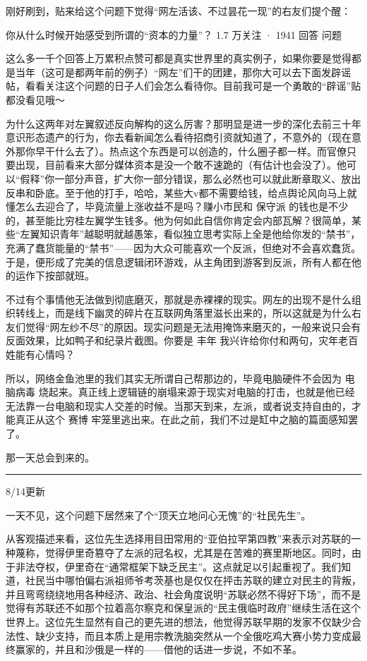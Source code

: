 \begin{zhihuanswer}
刚好刷到，贴来给这个问题下觉得``网左活该、不过昙花一现''的右友们提个醒：

你从什么时候开始感受到所谓的``资本的力量''？ 1.7 万关注 · 1941 回答 问题

这么多一千个回答上万累积点赞可都是真实世界里的真实例子，如果你要是觉得都是当年（这可是都两年前的例子）``网左''们干的团建，那你大可以去下面发辟谣帖，看看关注这个问题的日子人们会怎么看待你。目前我可是一个勇敢的``辟谣''贴都没看见哦～

为什么这两年对左翼叙述反向解构的这么厉害？那明显是进一步的深化去前三十年意识形态遗产的行为，你去看新闻怎么看待招商引资就知道了，不意外的（现在意外那你早干什么去了）。热点这个东西是可以创造的，什么圈子都一样。而官僚只要出现，目前看来大部分媒体资本是没一个敢不速跪的（有估计也会没了）。他可以``假释''你一部分声音，扩大你一部分错误，那么必然也可以就此断章取义、放出反串和卧底。至于他的打手，哈哈，某些大v都不需要给钱，给点舆论风向马上就懂怎么去迎合了，毕竟流量上涨收益不是吗？赚小市民和
保守派
的钱也是不少的，甚至能比穷桂左翼学生钱多。他为何如此自信你肯定会内部瓦解？很简单，某些``左翼知识青年''越聪明就越愚笨，看似独立思考实际上全是他给你发的``禁书''，充满了蠢货能量的``禁书''------因为大众可能喜欢一个反派，但绝对不会喜欢蠢货。于是，便形成了完美的信息逻辑闭环游戏，从主角团到游客到反派，所有人都在他的运作下按部就班。

不过有个事情他无法做到彻底磨灭，那就是赤裸裸的现实。网左的出现不是什么组织转线上，而是线下幽灵的碎片在互联网角落里滋长出来的，所以这就是为什么右友们觉得``网左纱不尽''的原因。现实问题是无法用掩饰来磨灭的，一般来说只会有反面效果，比如鸭子和纪录片截图。你要是
丰年 我兴许给你付和两句，灾年老百姓能有心情吗？

所以，网络金鱼池里的我们其实无所谓自己帮那边的，毕竟电脑硬件不会因为
电脑病毒
烧起来。真正线上逻辑链的崩塌来源于现实对电脑的打击，也就是他已经无法靠一台电脑和现实人交差的时候。当那天到来，左派，或者说支持自由的，才能真正从这个
赛博 牢笼里逃出来。在此之前，我们不过是缸中之脑的篇面感知罢了。

那一天总会到来的。

\begin{center}\rule{0.5\linewidth}{0.5pt}\end{center}

8/14更新

一天不见，这个问题下居然来了个``顶天立地问心无愧''的``社民先生''。

从客观描述来看，这位先生选择用目田常用的``亚伯拉罕第四教''来表示对苏联的一种蔑称，觉得伊里奇篡夺了左派的冠名权，尤其是在苦难的赛里斯地区。同时，由于非法夺权，伊里奇在``通常框架下缺乏民主''。这点就足以引起重视了。我们知道，社民当中哪怕偏右派祖师爷考茨基也是仅仅在抨击苏联的建立对民主的背叛，并且弯弯绕绕地用各种经济、政治、社会角度说明``苏联必然不得好下场''，而不是觉得有苏联还不如那个拉着高尔察克和保皇派的``民主俄临时政府''继续生活在这个世界上。这位先生显然有自己的更先进的想法，他觉得苏联早期的发家不仅缺少合法性、缺少支持，而且本质上是用宗教洗脑突然从一个全俄吃鸡大赛小势力变成最终赢家的，并且和沙俄是一样的------借他的话进一步说，不如不革。


\end{zhihuanswer}
